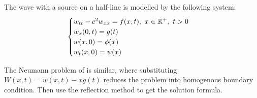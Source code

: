 \begin{defn} 
    The wave with a source on a half-line is modelled by the following system:
    \[\begin{cases}
        w_{tt} - c^2 w_{xx} = f(x,t),\ x\in {\mathbb R}^+,\ t>0\\
        w_x(0,t) = g(t)\\
        w(x,0) = \phi(x)\\
        w_t(x,0) = \psi(x)
    \end{cases}\]
\end{defn}

The Neumann problem of is similar, where substituting $W(x,t) = w(x,t)-xg(t)$ reduces the problem into homogenous boundary condition. Then use the reflection method to get the solution formula.